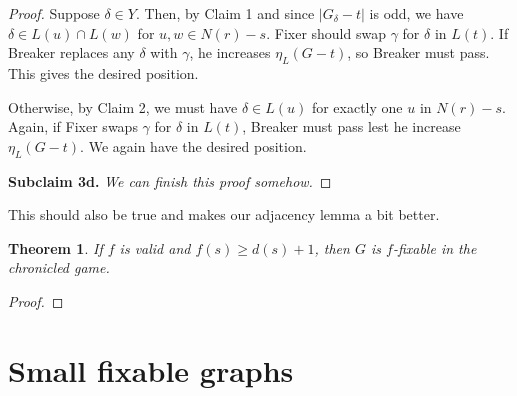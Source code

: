 \documentclass[12pt,reqno]{amsart}
\theoremstyle{plain}
\newtheorem{thm}{Theorem}
\theoremstyle{definition}
\theoremstyle{remark}
\newcommand{\card}[1]{\left|#1\right|}
\begin{document}
\begin{proof}
Suppose $\delta \in Y$. Then, by Claim 1 and since $\card{G_\delta - t}$ is odd, we have $\delta \in L(u) \cap L(w)$ for $u,w \in N(r) - s$.  Fixer should swap $\gamma$ for $\delta$ in $L(t)$.  If Breaker replaces any $\delta$ with $\gamma$, he increases $\eta_L(G - t)$, so Breaker must pass.  This gives the desired position.

Otherwise, by Claim 2, we must have $\delta \in L(u)$ for exactly one $u$ in $N(r) - s$.  Again, if Fixer swaps $\gamma$ for $\delta$ in $L(t)$, Breaker must pass lest he increase $\eta_L(G - t)$. We again have the desired position.

\noindent\textbf{Subclaim 3d.  }\textit{We can finish this proof somehow.}
\end{proof}

This should also be true and makes our adjacency lemma a bit better.
\begin{thm}\label{SubdividedStarWithLowIntermediate}
If $f$ is valid and $f(s) \ge d(s) + 1$, then $G$ is $f$-fixable in the chronicled game.
\end{thm}
\begin{proof}

\end{proof}

\section{Small fixable graphs}
\end{document}
